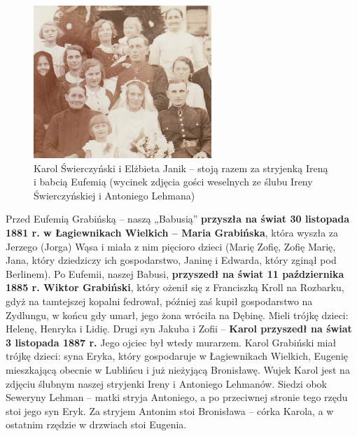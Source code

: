 \begin{figure}[!h]
\begin{center}
\includegraphics[width=0.6\textwidth]{photo/irena_antoni_lehman_slub_1.jpg}
\caption[Karol Świerczyński i Elżbieta Janik]{Karol Świerczyński i Elżbieta Janik -- stoją razem za stryjenką Ireną i babcią Eufemią (wycinek zdjęcia gości weselnych ze ślubu Ireny Świerczyńskiej i Antoniego Lehmana)}
\end{center}
\end{figure}

Przed Eufemią Grabińską – naszą „Babusią” \textbf{przyszła na świat 30 listopada 1881 r. w Łagiewnikach Wielkich – Maria Grabińska}, która wyszła za Jerzego (Jorga) Wąsa i miała z nim pięcioro dzieci (Marię Zofię, Zofię Marię, Jana, który dziedziczy ich gospodarstwo, Janinę i Edwarda, który zginął pod Berlinem). Po Eufemii, naszej Babusi, \textbf{przyszedł na świat 11 października 1885 r. Wiktor Grabiński}, który ożenił się z Franciszką Kroll na Rozbarku, gdyż na tamtejszej kopalni fedrował, później zaś kupił gospodarstwo na Zydlungu, w końcu gdy umarł, jego żona wróciła na Dębinę. Mieli trójkę dzieci: Helenę, Henryka i Lidię. Drugi syn Jakuba i Zofii – \textbf{Karol przyszedł na świat 3 listopada 1887 r.} Jego ojciec był wtedy murarzem. Karol Grabiński miał trójkę dzieci: syna Eryka, który gospodaruje w Łagiewnikach Wielkich, Eugenię mieszkającą obecnie w Lublińcu i już nieżyjącą Bronisławę. Wujek Karol jest na zdjęciu ślubnym naszej stryjenki Ireny i Antoniego Lehmanów. Siedzi obok Seweryny Lehman – matki stryja Antoniego, a po przeciwnej stronie tego rzędu stoi jego syn Eryk. Za stryjem Antonim stoi Bronisława – córka Karola, a w ostatnim rzędzie w drzwiach stoi Eugenia.

